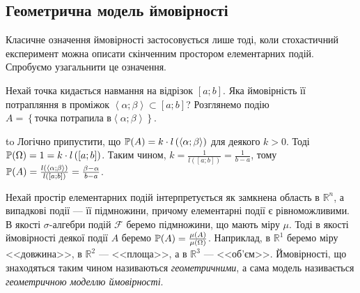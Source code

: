 \subsection{Геометрична модель ймовірності}
Класичне означення ймовірності застосовується лише тоді, коли стохастичний експеримент можна описати скінченним простором елементарних подій.
Спробуємо узагальнити це означення.
\begin{example}
    Нехай точка кидається навмання на відрізок $\left[a; b\right]$. 
    Яка ймовірність її 
    потрапляння в проміжок $\left<\alpha; \beta\right> \subset  \left[a; b\right]$?
    Розглянемо подію $A = \left\{ 
        \text{точка потрапила в} \left<\alpha; \beta\right>
    \right\}$.
    
    \vspace{0.5em}
    \hbox to 
    Логічно припустити, що $\P(A) = k\cdot l\left({\left<\alpha; \beta\right>}\right)$ для деякого $k > 0$.
    Тоді $\P(\Omega) = 1 = k\cdot l\left({\left[a; b\right]}\right)$. Таким чином, 
    $k = \frac{1}{l\left({\left[a; b\right]}\right)} = \frac{1}{b-a}$,
    тому $\P(A) = \frac{l\left({\left<\alpha; \beta\right>}\right)}{l\left({\left[a; b\right]}\right)} = 
    \frac{\beta - \alpha}{b - a}$.
\end{example}
\begin{definition}
    Нехай простір елементарних подій інтерпретується як замкнена область в 
    $ \mathbb{R} ^n$, а випадкові події --- її підмножини, причому елементарні події є рівноможливими. В якості $\sigma$-алгебри 
    подій $\mathcal{F}$ беремо підмножини, що мають міру $\mu$. Тоді в якості ймовірності 
    деякої події $A$ беремо $\P(A) = \frac{\mu(A)}{\mu(\Omega)}$. 
    Наприклад, в $\mathbb{R}^1$ беремо міру <<довжина>>, в $\mathbb{R}^2$ --- <<площа>>, а в $\mathbb{R}^3$ --- <<об'єм>>.
    Ймовірності, що знаходяться таким чином називаються \emph{геометричними}, а сама модель 
    називається \emph{геометричною моделлю ймовірності}.
    \end{definition}

